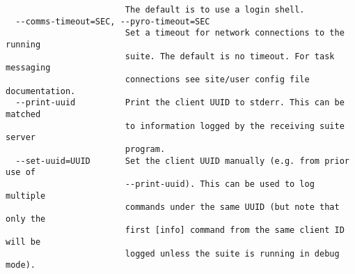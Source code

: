 \begin{lstlisting}
                        The default is to use a login shell.
  --comms-timeout=SEC, --pyro-timeout=SEC
                        Set a timeout for network connections to the running
                        suite. The default is no timeout. For task messaging
                        connections see site/user config file documentation.
  --print-uuid          Print the client UUID to stderr. This can be matched
                        to information logged by the receiving suite server
                        program.
  --set-uuid=UUID       Set the client UUID manually (e.g. from prior use of
                        --print-uuid). This can be used to log multiple
                        commands under the same UUID (but note that only the
                        first [info] command from the same client ID will be
                        logged unless the suite is running in debug mode).
\end{lstlisting}
